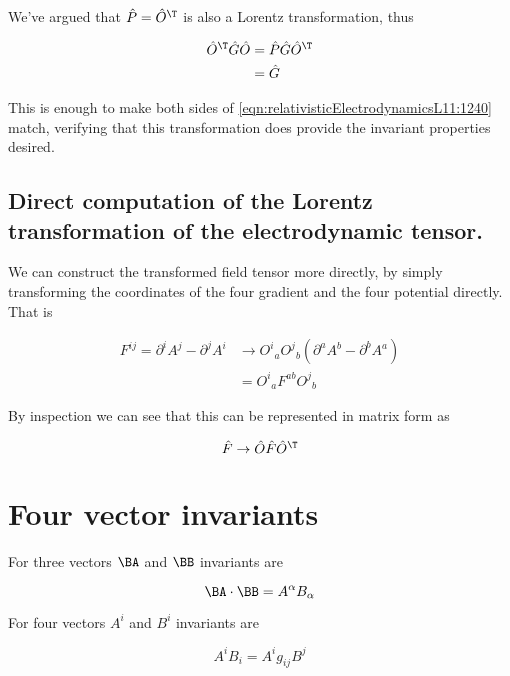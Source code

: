 We've argued that $\hat{P} = \hat{O}^\T$ is also a Lorentz transformation, thus 

\begin{align*}
\hat{O}^\T \hat{G} \hat{O}
&=
\hat{P} \hat{G} \hat{O}^\T \\
&=
\hat{G}
\end{align*}

This is enough to make both sides of \ref{eqn:relativisticElectrodynamicsL11:1240} match, verifying that this transformation does provide the invariant properties desired.

\subsection{Direct computation of the Lorentz transformation of the electrodynamic tensor.}

We can construct the transformed field tensor more directly, by simply transforming the coordinates of the four gradient and the four potential directly.  That is

\begin{align*}
F^{i j} = 
\partial^i A^j - \partial^j A^i
&\rightarrow 
{O^i}_a 
{O^j}_b 
\left( \partial^a A^b - \partial^b A^a \right) \\
&=
{O^i}_a F^{a b} {O^j}_b 
\end{align*}

By inspection we can see that this can be represented in matrix form as

\begin{equation}\label{eqn:relativisticElectrodynamicsL11:1300}
\hat{F} \rightarrow \hat{O} \hat{F} \hat{O}^\T
\end{equation}

\section{Four vector invariants}

For three vectors $\BA$ and $\BB$ invariants are

\begin{equation}\label{eqn:relativisticElectrodynamicsL11:510}
\BA \cdot \BB = A^\alpha B_\alpha
\end{equation}

For four vectors $A^i$ and $B^i$ invariants are

\begin{equation}\label{eqn:relativisticElectrodynamicsL11:530}
A^i B_i = A^i g_{i j} B^j  
\end{equation}

